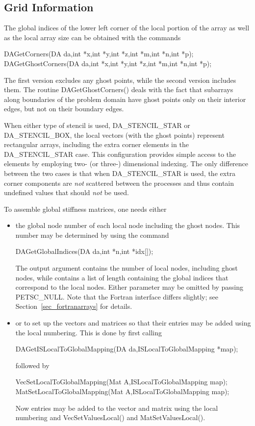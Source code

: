 \subsection{Grid Information}

The global indices of the lower left corner of the local portion of the array 
as well as the local array size can be obtained with the commands
\begin{tabbing}
  DAGetCorners(DA da,int *x,int *y,int *z,int *m,int *n,int *p);\\
  DAGetGhostCorners(DA da,int *x,int *y,int *z,int *m,int *n,int *p);
\end{tabbing}
The first version excludes any ghost points, while the second version
includes them. 
The routine DAGetGhostCorners()
deals with the fact that subarrays along boundaries of the problem
domain have ghost points only on their interior edges, but not on
their boundary edges.

When either type of stencil is used, DA_STENCIL_STAR or 
DA_STENCIL_BOX, the local vectors (with the ghost points) 
represent rectangular arrays, including the extra corner elements in 
the DA_STENCIL_STAR case. This configuration provides simple 
access to the elements by employing two- (or three-) dimensional indexing. 
The only difference between the 
two cases is that when DA_STENCIL_STAR is used, the extra 
corner components are {\em not} scattered between the processes and thus
contain undefined values that should {\em not} be used.

To assemble global stiffness matrices, one needs either 
\begin{itemize}
\item
the global node number of each local node 
including the ghost nodes. This number may be determined by using the 
command 
\begin{tabbing}
  DAGetGlobalIndices(DA da,int *n,int *idx[]);
\end{tabbing}
The output argument  contains the number of 
local nodes, including ghost nodes, while  contains a list of length
 containing the global indices that correspond to the local nodes. Either
parameter may be omitted by passing PETSC_NULL. Note that the Fortran
interface differs slightly; see Section~\ref{sec_fortranarrays} for details.
\item
or to set up the vectors and matrices so that their entries may be
added using the local numbering. This is done by first calling 
\begin{tabbing}
  DAGetISLocalToGlobalMapping(DA da,ISLocalToGlobalMapping *map);
\end{tabbing}
followed by 
\begin{tabbing}
  VecSetLocalToGlobalMapping(Mat A,ISLocalToGlobalMapping map);\\
  MatSetLocalToGlobalMapping(Mat A,ISLocalToGlobalMapping map);
\end{tabbing}
Now entries may be added to the vector and matrix using the local numbering
and VecSetValuesLocal() and MatSetValuesLocal().
\end{itemize}

